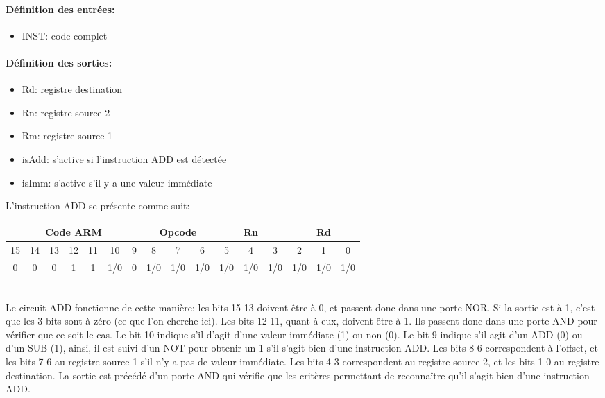 \documentclass[a4paper]{article} %
\begin{document}
\paragraph{Définition des entrées:}
\begin{itemize}
    \item     INST: code complet
\end{itemize}

\paragraph{Définition des sorties:}
\begin{itemize}
    \item     Rd: registre destination
    \item     Rn: registre source 2
    \item     Rm: registre source 1
    \item     isAdd: s'active si l'instruction ADD est détectée
    \item     isImm: s'active s'il y a une valeur immédiate
\end{itemize}
\medskip 

L'instruction ADD se présente comme suit:\\
\begin{tabular}{|ccccccc|ccc|ccc|ccc|}
    \hline
    \multicolumn{7}{|c|}{Code ARM}  & \multicolumn{3}{|c|}{Opcode} & \multicolumn{3}{|c|}{Rn} & \multicolumn{3}{|c|}{Rd}\\
    \hline
    15 & 14 & 13 & 12 & 11 & 10  & 9 & 8   & 7   & 6                 & 5 & 4 & 3                & 2   & 1   & 0 \\
    \hline
    0  & 0  & 0  & 1  & 1  & 1/0 & 0 & 1/0 & 1/0 & 1/0               & 1/0 & 1/0 & 1/0                & 1/0 & 1/0 & 1/0 \\
    \hline     
    \end{tabular}
     \medskip \\
    Le circuit ADD fonctionne de cette manière: les bits 15-13 doivent être à 0, et passent donc dans une porte NOR. Si la sortie est à 1, c'est que les 3 bits sont à zéro (ce que l'on cherche ici). Les bits 12-11, quant à eux, doivent être à 1. Ils passent donc dans une porte AND pour vérifier que ce soit le cas. Le bit 10 indique s'il d'agit d'une valeur immédiate (1) ou non (0). Le bit 9 indique s'il agit d'un ADD (0) ou d'un SUB (1), ainsi, il est suivi d'un NOT pour obtenir un 1 s'il s'agit bien d'une instruction ADD. Les bits 8-6 correspondent à l'offset, et les bits 7-6 au registre source 1 s'il n'y a pas de valeur immédiate. Les bits 4-3 correspondent au registre source 2, et les bits 1-0 au registre destination.
    La sortie est précédé d'un porte AND qui vérifie que les critères permettant de reconnaître qu'il s'agit bien d'une instruction ADD.
    
\end{document}
